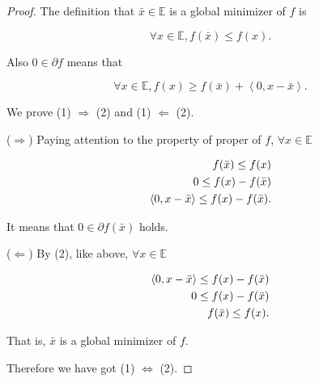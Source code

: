 \documentclass[a4paper,11pt]{jsarticle}
\begin{document}
\begin{proof}
  The definition that $\bar{x} \in \mathbb{E}$ is a global minimizer of $f$ is

  \begin{equation}
    \forall x \in \mathbb{E},f(\bar{x}) \leq f(x).
  \end{equation}

  Also $0 \in \partial f$ means that

  \begin{equation}
    \forall x \in \mathbb{E}, f(x) \geq f(\bar{x}) + \left\langle 0, x-\bar{x} \right\rangle.
  \end{equation}

  We prove (1) $\Rightarrow $ (2) and  (1) $\Leftarrow $ (2).

  ($\Rightarrow$) Paying attention to the property of proper of $f$, $\forall x \in \mathbb{E}$

  \begin{equation}
    \begin{split}
      f(\bar{x}) \leq f(x)\\
      0 \leq f(x) - f(\bar{x})\\
      \left\langle 0, x-\bar{x} \right\rangle \leq f(x) - f(\bar{x}). \notag
    \end{split}
  \end{equation}

  It means that $0 \in \partial f(\bar{x})$ holds.

  ($\Leftarrow$) By (2), like above, $\forall x \in \mathbb{E}$

  \begin{equation}
    \begin{split}
      \left\langle 0, x-\bar{x} \right\rangle \leq f(x) - f(\bar{x})\\
      0 \leq f(x) - f(\bar{x})\\
      f(\bar{x}) \leq f(x). \notag
    \end{split}
  \end{equation}

  That is, $\bar{x}$ is a global minimizer of $f$.

  Therefore we have got (1) $\Leftrightarrow$ (2).

\end{proof}

\begin{center}
\end{center}
\end{document}
